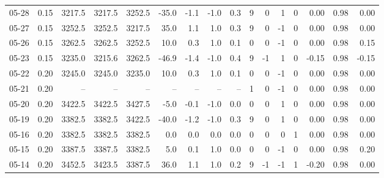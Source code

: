 \begin{threeparttable}
{\begin{tabular}{lrrrrrrrrrrrrrrr}
  05-28 &     0.15 & 3217.5 & 3217.5 & 3252.5 &      -35.0 &           -1.1 &                     -1.0 &                 0.3 &              9 &         0 &     1 &         0 &       0.00 &      0.98 &           0.00 \\
  05-27 &     0.15 & 3252.5 & 3252.5 & 3217.5 &       35.0 &            1.1 &                      1.0 &                 0.3 &              9 &         0 &    -1 &         0 &       0.00 &      0.98 &           0.00 \\
  05-26 &     0.15 & 3262.5 & 3262.5 & 3252.5 &       10.0 &            0.3 &                      1.0 &                 0.1 &              0 &         0 &    -1 &         0 &       0.00 &      0.98 &           0.15 \\
  05-23 &     0.15 & 3235.0 & 3215.6 & 3262.5 &      -46.9 &           -1.4 &                     -1.0 &                 0.4 &              9 &        -1 &     1 &         0 &      -0.15 &      0.98 &          -0.15 \\
  05-22 &     0.20 & 3245.0 & 3245.0 & 3235.0 &       10.0 &            0.3 &                      1.0 &                 0.1 &              0 &         0 &    -1 &         0 &       0.00 &      0.98 &           0.00 \\
  05-21 &     0.20 &     -- &     -- &     -- &         -- &             -- &                       -- &                  -- &              1 &         0 &    -1 &         0 &       0.00 &      0.98 &           0.00 \\
  05-20 &     0.20 & 3422.5 & 3422.5 & 3427.5 &       -5.0 &           -0.1 &                     -1.0 &                 0.0 &              0 &         0 &     1 &         0 &       0.00 &      0.98 &           0.00 \\
  05-19 &     0.20 & 3382.5 & 3382.5 & 3422.5 &      -40.0 &           -1.2 &                     -1.0 &                 0.3 &              9 &         0 &     1 &         0 &       0.00 &      0.98 &           0.00 \\
  05-16 &     0.20 & 3382.5 & 3382.5 & 3382.5 &        0.0 &            0.0 &                      0.0 &                 0.0 &              0 &         0 &     0 &         1 &       0.00 &      0.98 &           0.00 \\
  05-15 &     0.20 & 3387.5 & 3387.5 & 3382.5 &        5.0 &            0.1 &                      1.0 &                 0.0 &              0 &         0 &    -1 &         0 &       0.00 &      0.98 &           0.20 \\
  05-14 &     0.20 & 3452.5 & 3423.5 & 3387.5 &       36.0 &            1.1 &                      1.0 &                 0.2 &              9 &        -1 &    -1 &         1 &      -0.20 &      0.98 &           0.00 \\

\end{tabular}}
\end{threeparttable}
